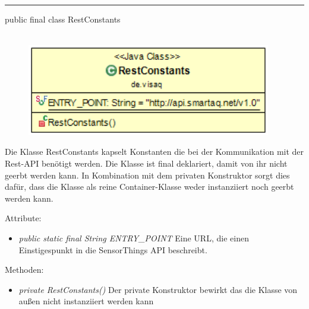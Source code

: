 \rule{\textwidth}{0.4pt}
public final class RestConstants
\\\\
\begin{minipage}{0.4\textwidth}
    \begin{figure}[H]
        {\centering\includegraphics[width=0.95\textwidth]{media/backend/modell/classes/RestConstants.png}}
    \end{figure}
    \end{minipage} \hfill
\begin{minipage}{0.6\textwidth}
    Die Klasse RestConstants kapselt Konstanten die bei der Kommunikation mit der Rest-API benötigt werden.
    Die Klasse ist final deklariert, damit von ihr nicht geerbt werden kann.
    In Kombination mit dem privaten Konstruktor sorgt dies dafür, dass die Klasse als reine Container-Klasse weder instanziiert noch geerbt werden kann.
\end{minipage}

Attribute:
\begin{itemize}
    \item \emph{public static final String ENTRY\_POINT} Eine URL, die einen Einstigespunkt in die \gls{SensorThings API} beschreibt.
\end{itemize}
Methoden:
\begin{itemize}
    \item \emph{private RestConstants()}
    Der private Konstruktor bewirkt das die Klasse von außen nicht instanziiert werden kann
\end{itemize}

